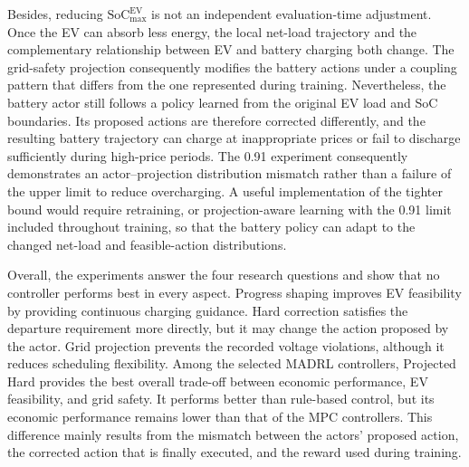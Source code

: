 Besides, reducing $\mathrm{SoC}_{\max}^{\mathrm{EV}}$ is not an independent evaluation-time adjustment. Once the EV can absorb less energy, the local net-load trajectory and the complementary relationship between EV and battery charging both change. The grid-safety projection consequently modifies the battery actions under a coupling pattern that differs from the one represented during training. Nevertheless, the battery actor still follows a policy learned from the original EV load and SoC boundaries. Its proposed actions are therefore corrected differently, and the resulting battery trajectory can charge at inappropriate prices or fail to discharge sufficiently during high-price periods. The 0.91 experiment consequently demonstrates an actor--projection distribution mismatch rather than a failure of the upper limit to reduce overcharging. A useful implementation of the tighter bound would require retraining, or projection-aware learning with the 0.91 limit included throughout training, so that the battery policy can adapt to the changed net-load and feasible-action distributions.

Overall, the experiments answer the four research questions and show that no controller performs best in every aspect. Progress shaping improves EV feasibility by providing continuous charging guidance. Hard correction satisfies the departure requirement more directly, but it may change the action proposed by the actor. Grid projection prevents the recorded voltage violations, although it reduces scheduling flexibility. Among the selected MADRL controllers, Projected Hard provides the best overall trade-off between economic performance, EV feasibility, and grid safety. It performs better than rule-based control, but its economic performance remains lower than that of the MPC controllers. This difference mainly results from the mismatch between the actors' proposed action, the corrected action that is finally executed, and the reward used during training.
